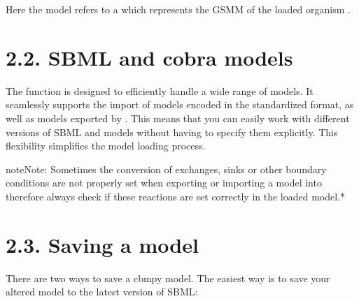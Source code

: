 \documentclass[letterpaper,10pt,english]{sphinxmanual}
\begin{document}
\begin{sphinxVerbatim}[commandchars=\\\{\}]
 
   

   
  
  \PYG{p}{[}\PYG{p}{]} \PYG{p}{[}\PYG{p}{]}
\end{sphinxVerbatim}

\sphinxAtStartPar
Here the model refers to a  which represents the GSMM of the loaded organism .


\section{2.2. SBML and cobra models}
\label{\detokenize{2_getting_started/home:sbml-and-cobra-models}}
\sphinxAtStartPar
The  function is designed to efficiently handle a wide range of models. It seamlessly supports the
import of models encoded in the standardized  format, as well as models exported by
. This means that you can easily work with different versions of SBML and  models without having to
specify them explicitly. This flexibility simplifies the model loading process.

\begin{sphinxadmonition}{note}{Note:}
\sphinxAtStartPar
Sometimes the conversion of exchanges, sinks or other boundary conditions are not properly set when exporting or importing
a  model into  therefore always check if these reactions are set correctly in the loaded model.*
\end{sphinxadmonition}


\section{2.3. Saving a model}
\label{\detokenize{2_getting_started/home:saving-a-model}}
\sphinxAtStartPar
There are two ways to save a cbmpy model. The easiest way is to save your altered model to the latest version of SBML:
\end{document}
